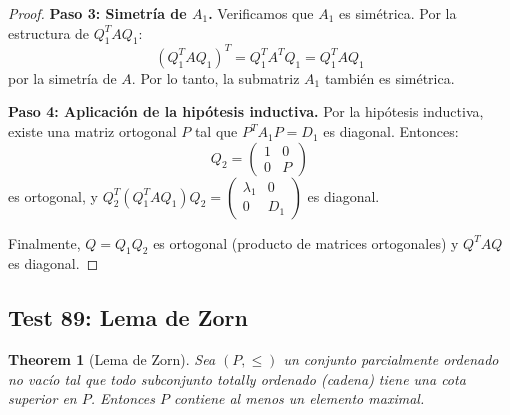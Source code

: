 \documentclass[11pt,a4paper]{article}
\theoremstyle{plain}
\newtheorem{theorem}{Theorem}[section]
\theoremstyle{definition}
\begin{document}
\begin{proof}
\textbf{Paso 3: Simetría de $A_1$.} Verificamos que $A_1$ es simétrica. Por la estructura de $Q_1^T A Q_1$:
\[
(Q_1^T A Q_1)^T = Q_1^T A^T Q_1 = Q_1^T A Q_1
\]
por la simetría de $A$. Por lo tanto, la submatriz $A_1$ también es simétrica.

\textbf{Paso 4: Aplicación de la hipótesis inductiva.} Por la hipótesis inductiva, existe una matriz ortogonal $P$ tal que $P^T A_1 P = D_1$ es diagonal. Entonces:
\[
Q_2 = \begin{pmatrix} 1 & 0 \\ 0 & P \end{pmatrix}
\]
es ortogonal, y $Q_2^T (Q_1^T A Q_1) Q_2 = \begin{pmatrix} \lambda_1 & 0 \\ 0 & D_1 \end{pmatrix}$ es diagonal.

Finalmente, $Q = Q_1 Q_2$ es ortogonal (producto de matrices ortogonales) y $Q^T A Q$ es diagonal.
\end{proof}

\subsection{Test 89: Lema de Zorn}

\begin{theorem}[Lema de Zorn]
Sea $(P, \leq)$ un conjunto parcialmente ordenado no vacío tal que todo subconjunto totally ordenado (cadena) tiene una cota superior en $P$. Entonces $P$ contiene al menos un elemento maximal.
\end{theorem}
\end{document}
